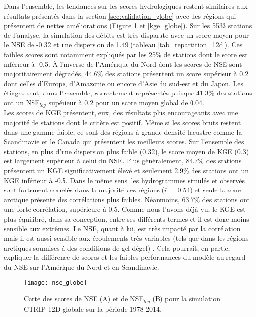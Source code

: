 Dans l'ensemble, les tendances sur les scores hydrologiques restent similaires aux résultats présentés dans la section \ref{sec:validation_globe} avec des régions qui présentent de nettes améliorations (Figure \ref{nse_globe} et \ref{kge_globe}). Sur les 5533 stations de l'analyse, la simulation des débits est très disparate avec un score moyen pour le NSE de -0.32 et une dispersion de 1.49 (tableau \ref{tab_repartition_12d}). Ces faibles scores sont notamment expliqués par les 25\% de stations dont le score est inférieur à -0.5. À l'inverse de l'Amérique du Nord dont les scores de NSE sont majoritairement dégradés, 44.6­\% des stations présentent un score supérieur à 0.2 dont celles d'Europe, d'Amazonie ou encore d'Asie du sud-est et du Japon. Les étiages sont, dans l'ensemble, correctement représentés puisque 41.3\% des stations ont un NSE$_{log}$ supérieur à 0.2 pour un score moyen global de 0.04.\\
Les scores de KGE présentent, eux, des résultats plus encourageants avec une majorité de stations dont le critère est positif. Même si les scores bruts restent dans une gamme faible, ce sont des régions à grande densité lacustre comme la Scandinavie et le Canada qui présentent les meilleurs scores. Sur l'ensemble des stations, en plus d'une dispersion plus faible (0.32), le score moyen de KGE (0.3) est largement supérieur à celui du NSE. Plus généralement, 84.7\% des stations présentent un KGE significativement élevé et seulement 2.9\% des stations ont un KGE inférieur à -0.5. Dans le même sens, les hydrogrammes simulés et observés sont fortement corrélés  dans la majorité des régions ($\overline{r}$ = 0.54) et seule la zone arctique présente des corrélations plus faibles. Néanmoins, 63.7\% des stations ont une forte corrélation, supérieure à 0.5. Comme nous l'avons déjà vu, le KGE est plus équilibré, dans sa conception, entre ses différents termes et il est donc moins sensible aux extrêmes. Le NSE, quant à lui, est très impacté par la corrélation mais il est aussi sensible aux écoulements très variables (tels que dans les régions arctiques soumises à des conditions de gel-dégel) \citep{gupta2009}. Cela pourrait, en partie, expliquer la différence de scores et les faibles performances du modèle au regard du NSE sur l'Amérique du Nord et en Scandinavie.\\

\begin{figure}
\centering
\texttt{[image: nse\_globe]}
\caption{Carte des scores de NSE (A) et de NSE$_{log}$ (B) pour la simulation CTRIP-12D globale sur la période 1978-2014.}
\label{nse_globe}
\end{figure}

